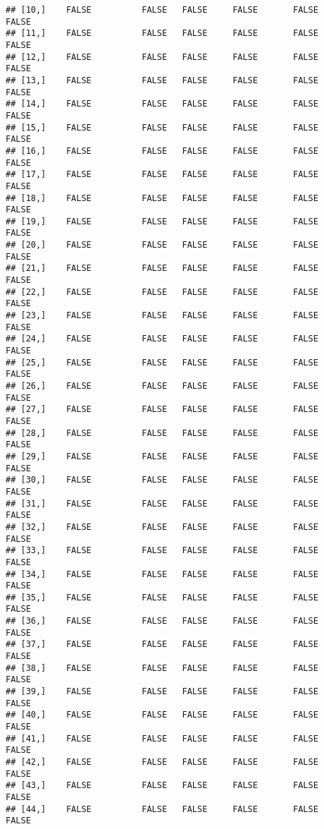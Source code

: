 \documentclass[
]{article}
\begin{document}
\begin{verbatim}
## [10,]    FALSE          FALSE   FALSE     FALSE       FALSE       FALSE
## [11,]    FALSE          FALSE   FALSE     FALSE       FALSE       FALSE
## [12,]    FALSE          FALSE   FALSE     FALSE       FALSE       FALSE
## [13,]    FALSE          FALSE   FALSE     FALSE       FALSE       FALSE
## [14,]    FALSE          FALSE   FALSE     FALSE       FALSE       FALSE
## [15,]    FALSE          FALSE   FALSE     FALSE       FALSE       FALSE
## [16,]    FALSE          FALSE   FALSE     FALSE       FALSE       FALSE
## [17,]    FALSE          FALSE   FALSE     FALSE       FALSE       FALSE
## [18,]    FALSE          FALSE   FALSE     FALSE       FALSE       FALSE
## [19,]    FALSE          FALSE   FALSE     FALSE       FALSE       FALSE
## [20,]    FALSE          FALSE   FALSE     FALSE       FALSE       FALSE
## [21,]    FALSE          FALSE   FALSE     FALSE       FALSE       FALSE
## [22,]    FALSE          FALSE   FALSE     FALSE       FALSE       FALSE
## [23,]    FALSE          FALSE   FALSE     FALSE       FALSE       FALSE
## [24,]    FALSE          FALSE   FALSE     FALSE       FALSE       FALSE
## [25,]    FALSE          FALSE   FALSE     FALSE       FALSE       FALSE
## [26,]    FALSE          FALSE   FALSE     FALSE       FALSE       FALSE
## [27,]    FALSE          FALSE   FALSE     FALSE       FALSE       FALSE
## [28,]    FALSE          FALSE   FALSE     FALSE       FALSE       FALSE
## [29,]    FALSE          FALSE   FALSE     FALSE       FALSE       FALSE
## [30,]    FALSE          FALSE   FALSE     FALSE       FALSE       FALSE
## [31,]    FALSE          FALSE   FALSE     FALSE       FALSE       FALSE
## [32,]    FALSE          FALSE   FALSE     FALSE       FALSE       FALSE
## [33,]    FALSE          FALSE   FALSE     FALSE       FALSE       FALSE
## [34,]    FALSE          FALSE   FALSE     FALSE       FALSE       FALSE
## [35,]    FALSE          FALSE   FALSE     FALSE       FALSE       FALSE
## [36,]    FALSE          FALSE   FALSE     FALSE       FALSE       FALSE
## [37,]    FALSE          FALSE   FALSE     FALSE       FALSE       FALSE
## [38,]    FALSE          FALSE   FALSE     FALSE       FALSE       FALSE
## [39,]    FALSE          FALSE   FALSE     FALSE       FALSE       FALSE
## [40,]    FALSE          FALSE   FALSE     FALSE       FALSE       FALSE
## [41,]    FALSE          FALSE   FALSE     FALSE       FALSE       FALSE
## [42,]    FALSE          FALSE   FALSE     FALSE       FALSE       FALSE
## [43,]    FALSE          FALSE   FALSE     FALSE       FALSE       FALSE
## [44,]    FALSE          FALSE   FALSE     FALSE       FALSE       FALSE

\end{verbatim}
\end{document}
